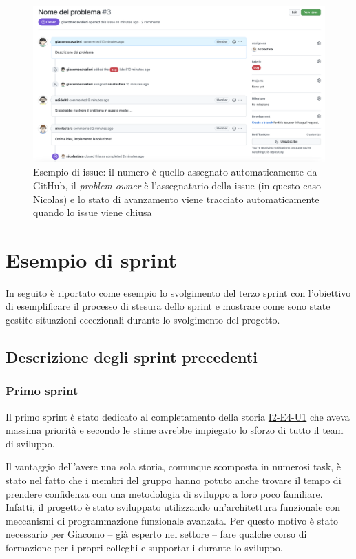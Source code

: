 \begin{figure}[htp]
  \centering
  \includegraphics[width=\textwidth]{images/issue-example.png}
  \caption{Esempio di issue: il numero è quello assegnato automaticamente da GitHub, il \emph{problem owner} è l'assegnatario della issue (in questo caso Nicolas) e lo stato di avanzamento viene tracciato automaticamente quando lo issue viene chiusa}
  \label{fig:issue-log}
\end{figure}

\section{Esempio di sprint}
In seguito è riportato come esempio lo svolgimento del terzo sprint con l'obiettivo di esemplificare il processo di stesura dello sprint e mostrare come sono state gestite situazioni eccezionali durante lo svolgimento del progetto.

\subsection{Descrizione degli sprint precedenti}
\subsubsection{Primo sprint}
Il primo sprint è stato dedicato al completamento della storia \href{user-story:i2-e4-u1}{I2-E4-U1} che aveva massima priorità e secondo le stime avrebbe impiegato lo sforzo di tutto il team di sviluppo.

Il vantaggio dell'avere una sola storia, comunque scomposta in numerosi task, è stato nel fatto che i membri del gruppo hanno potuto anche trovare il tempo di prendere confidenza con una metodologia di sviluppo a loro poco familiare. Infatti, il progetto è stato sviluppato utilizzando un'architettura funzionale con meccanismi di programmazione funzionale avanzata.
Per questo motivo è stato necessario per Giacomo -- già esperto nel settore -- fare qualche corso di formazione per i propri colleghi e supportarli durante lo sviluppo.

